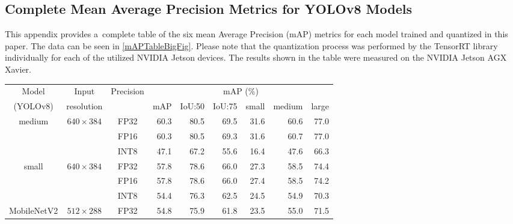 \begin{appendices}
\chapter{Complete Mean Average Precision Metrics for YOLOv8 Models}
\label{mAPTableBig}

This appendix provides a~complete table of the six mean Average Precision
(mAP) metrics for each model trained and quantized in this paper. The data can
be seen in \autoref{mAPTableBigFig}. Please note that the quantization process
was performed by the TensorRT library individually for each of the utilized
NVIDIA Jetson devices. The results shown in the table were measured on the
NVIDIA Jetson AGX Xavier.

\begin{table}[t]
    \centering
    \small
    \begin{threeparttable}
        \begin{tabular}{|c|c|c|rrrrrr|}
            \hline
            Model & Input & \multirow{2}{*}{Precision} &  \multicolumn{6}{c|}{mAP (\%)} \\
            \cline{4-9}
            (YOLOv8)                     & resolution                      &      & mAP   & IoU:50& IoU:75& small & medium& large \\
            \hline
            \hline
            \multirow{3}{*}{medium}     & \multirow{3}{*}{$640\times384$}  & FP32 & 60.3 & 80.5 & 69.5 & 31.6 & 60.6 & 77.0 \\
                                        &                                  & FP16 & 60.3 & 80.5 & 69.3 & 31.6 & 60.7 & 77.0 \\
                                        &                                  & INT8 & 47.1 & 67.2 & 55.6 & 16.4 & 47.6 & 66.3 \\
            \hline                                                           
            \multirow{3}{*}{small}      & \multirow{3}{*}{$640\times384$}  & FP32 & 57.8 & 78.6 & 66.0 & 27.3 & 58.5 & 74.4 \\
                                        &                                  & FP16 & 57.8 & 78.6 & 66.0 & 27.4 & 58.5 & 74.2 \\
                                        &                                  & INT8 & 54.4 & 76.3 & 62.5 & 24.5 & 54.9 & 70.3 \\
            \hline
            \multirow{3}{*}{MobileNetV2}& \multirow{3}{*}{$512\times288$}  & FP32 & 54.8 & 75.9 & 61.8 & 23.5 & 55.0 & 71.5 \\

\end{tabular}
\end{threeparttable}
\end{table}
\end{appendices}
